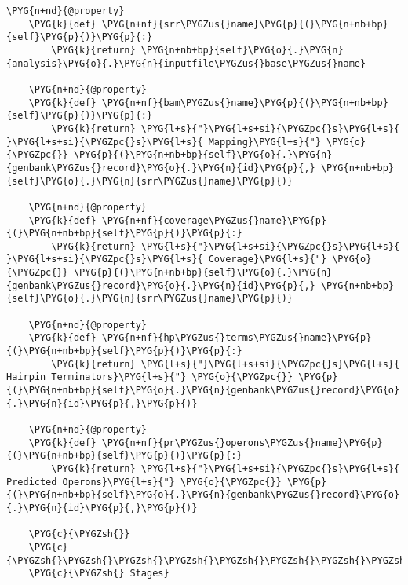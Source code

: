 \begin{Verbatim}[commandchars=\\\{\}]
    \PYG{n+nd}{@property}
    \PYG{k}{def} \PYG{n+nf}{srr\PYGZus{}name}\PYG{p}{(}\PYG{n+nb+bp}{self}\PYG{p}{)}\PYG{p}{:}
        \PYG{k}{return} \PYG{n+nb+bp}{self}\PYG{o}{.}\PYG{n}{analysis}\PYG{o}{.}\PYG{n}{inputfile\PYGZus{}base\PYGZus{}name}

    \PYG{n+nd}{@property}
    \PYG{k}{def} \PYG{n+nf}{bam\PYGZus{}name}\PYG{p}{(}\PYG{n+nb+bp}{self}\PYG{p}{)}\PYG{p}{:}
        \PYG{k}{return} \PYG{l+s}{"}\PYG{l+s+si}{\PYGZpc{}s}\PYG{l+s}{ }\PYG{l+s+si}{\PYGZpc{}s}\PYG{l+s}{ Mapping}\PYG{l+s}{"} \PYG{o}{\PYGZpc{}} \PYG{p}{(}\PYG{n+nb+bp}{self}\PYG{o}{.}\PYG{n}{genbank\PYGZus{}record}\PYG{o}{.}\PYG{n}{id}\PYG{p}{,} \PYG{n+nb+bp}{self}\PYG{o}{.}\PYG{n}{srr\PYGZus{}name}\PYG{p}{)}

    \PYG{n+nd}{@property}
    \PYG{k}{def} \PYG{n+nf}{coverage\PYGZus{}name}\PYG{p}{(}\PYG{n+nb+bp}{self}\PYG{p}{)}\PYG{p}{:}
        \PYG{k}{return} \PYG{l+s}{"}\PYG{l+s+si}{\PYGZpc{}s}\PYG{l+s}{ }\PYG{l+s+si}{\PYGZpc{}s}\PYG{l+s}{ Coverage}\PYG{l+s}{"} \PYG{o}{\PYGZpc{}} \PYG{p}{(}\PYG{n+nb+bp}{self}\PYG{o}{.}\PYG{n}{genbank\PYGZus{}record}\PYG{o}{.}\PYG{n}{id}\PYG{p}{,} \PYG{n+nb+bp}{self}\PYG{o}{.}\PYG{n}{srr\PYGZus{}name}\PYG{p}{)}

    \PYG{n+nd}{@property}
    \PYG{k}{def} \PYG{n+nf}{hp\PYGZus{}terms\PYGZus{}name}\PYG{p}{(}\PYG{n+nb+bp}{self}\PYG{p}{)}\PYG{p}{:}
        \PYG{k}{return} \PYG{l+s}{"}\PYG{l+s+si}{\PYGZpc{}s}\PYG{l+s}{ Hairpin Terminators}\PYG{l+s}{"} \PYG{o}{\PYGZpc{}} \PYG{p}{(}\PYG{n+nb+bp}{self}\PYG{o}{.}\PYG{n}{genbank\PYGZus{}record}\PYG{o}{.}\PYG{n}{id}\PYG{p}{,}\PYG{p}{)}

    \PYG{n+nd}{@property}
    \PYG{k}{def} \PYG{n+nf}{pr\PYGZus{}operons\PYGZus{}name}\PYG{p}{(}\PYG{n+nb+bp}{self}\PYG{p}{)}\PYG{p}{:}
        \PYG{k}{return} \PYG{l+s}{"}\PYG{l+s+si}{\PYGZpc{}s}\PYG{l+s}{ Predicted Operons}\PYG{l+s}{"} \PYG{o}{\PYGZpc{}} \PYG{p}{(}\PYG{n+nb+bp}{self}\PYG{o}{.}\PYG{n}{genbank\PYGZus{}record}\PYG{o}{.}\PYG{n}{id}\PYG{p}{,}\PYG{p}{)}

    \PYG{c}{\PYGZsh{}}
    \PYG{c}{\PYGZsh{}\PYGZsh{}\PYGZsh{}\PYGZsh{}\PYGZsh{}\PYGZsh{}\PYGZsh{}\PYGZsh{}\PYGZsh{}\PYGZsh{}\PYGZsh{}\PYGZsh{}\PYGZsh{}\PYGZsh{}\PYGZsh{}\PYGZsh{}\PYGZsh{}\PYGZsh{}\PYGZsh{}\PYGZsh{}\PYGZsh{}\PYGZsh{}\PYGZsh{}\PYGZsh{}\PYGZsh{}\PYGZsh{}\PYGZsh{}\PYGZsh{}\PYGZsh{}\PYGZsh{}\PYGZsh{}\PYGZsh{}\PYGZsh{}\PYGZsh{}\PYGZsh{}\PYGZsh{}\PYGZsh{}\PYGZsh{}\PYGZsh{}\PYGZsh{}\PYGZsh{}\PYGZsh{}\PYGZsh{}\PYGZsh{}\PYGZsh{}\PYGZsh{}\PYGZsh{}\PYGZsh{}\PYGZsh{}\PYGZsh{}\PYGZsh{}\PYGZsh{}\PYGZsh{}\PYGZsh{}\PYGZsh{}\PYGZsh{}\PYGZsh{}\PYGZsh{}\PYGZsh{}\PYGZsh{}\PYGZsh{}\PYGZsh{}\PYGZsh{}\PYGZsh{}\PYGZsh{}\PYGZsh{}\PYGZsh{}\PYGZsh{}\PYGZsh{}\PYGZsh{}\PYGZsh{}\PYGZsh{}\PYGZsh{}\PYGZsh{}\PYGZsh{}\PYGZsh{}}
    \PYG{c}{\PYGZsh{} Stages}


\end{Verbatim}
